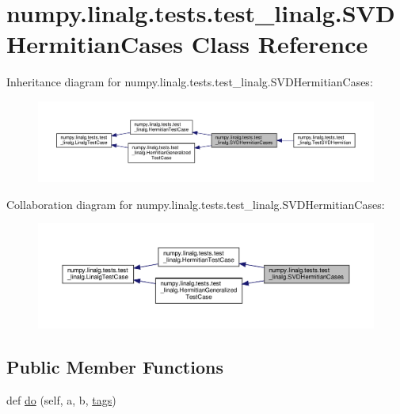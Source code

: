 \hypertarget{classnumpy_1_1linalg_1_1tests_1_1test__linalg_1_1SVDHermitianCases}{}\section{numpy.\+linalg.\+tests.\+test\+\_\+linalg.\+S\+V\+D\+Hermitian\+Cases Class Reference}
\label{classnumpy_1_1linalg_1_1tests_1_1test__linalg_1_1SVDHermitianCases}


Inheritance diagram for numpy.\+linalg.\+tests.\+test\+\_\+linalg.\+S\+V\+D\+Hermitian\+Cases\+:
\nopagebreak
\begin{figure}[H]
\begin{center}
\leavevmode
\includegraphics[width=350pt]{classnumpy_1_1linalg_1_1tests_1_1test__linalg_1_1SVDHermitianCases__inherit__graph}
\end{center}
\end{figure}


Collaboration diagram for numpy.\+linalg.\+tests.\+test\+\_\+linalg.\+S\+V\+D\+Hermitian\+Cases\+:
\nopagebreak
\begin{figure}[H]
\begin{center}
\leavevmode
\includegraphics[width=350pt]{classnumpy_1_1linalg_1_1tests_1_1test__linalg_1_1SVDHermitianCases__coll__graph}
\end{center}
\end{figure}
\subsection*{Public Member Functions}
\begin{DoxyCompactItemize}
\item 
def \hyperlink{classnumpy_1_1linalg_1_1tests_1_1test__linalg_1_1SVDHermitianCases_aaad1bb53bbb0f6757a1d983eed8aa477}{do} (self, a, b, \hyperlink{namespacenumpy_1_1linalg_1_1tests_1_1test__linalg_ac6a064918e74d701a7b5aac0ffefe1e7}{tags})
\end{DoxyCompactItemize}
